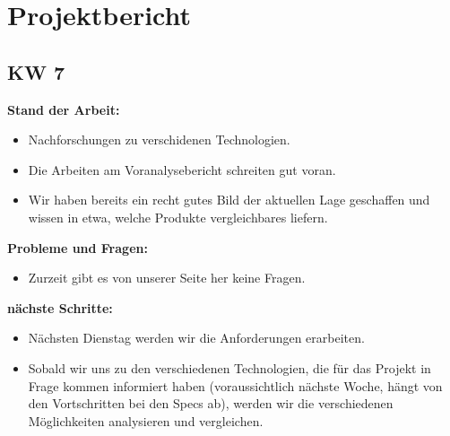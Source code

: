 \documentclass[10pt,paper=a4,final]{scrartcl}
\begin{document}
\section{Projektbericht}
\subsection{KW 7}
\begin{description}
  \item {\bf Stand der Arbeit: } \\
    \begin{itemize}
      \item Nachforschungen zu verschidenen Technologien.
      \item Die Arbeiten am Voranalysebericht schreiten gut voran.
      \item Wir haben bereits ein recht gutes Bild der aktuellen Lage geschaffen und wissen in etwa, welche Produkte vergleichbares liefern.
    \end{itemize}
  \item {\bf Probleme und Fragen: } \\
    \begin{itemize}
      \item Zurzeit gibt es von unserer Seite her keine Fragen.
    \end{itemize}
  \item {\bf nächste Schritte: } \\
    \begin{itemize}
      \item Nächsten Dienstag werden wir die Anforderungen erarbeiten.
      \item Sobald wir uns zu den verschiedenen Technologien, die für das Projekt in Frage kommen informiert haben (voraussichtlich nächste Woche, hängt von den Vortschritten bei den Specs ab), werden wir die verschiedenen Möglichkeiten analysieren und vergleichen.
    \end{itemize}
\end{description}
\end{document}
